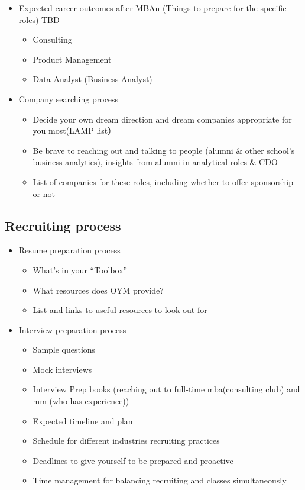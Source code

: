 \documentclass[
]{book}
\providecommand{\tightlist}{%
  \setlength{\itemsep}{0pt}\setlength{\parskip}{0pt}}
\begin{document}
\begin{itemize}
\tightlist
\item
  Expected career outcomes after MBAn (Things to prepare for the specific roles) TBD

  \begin{itemize}
  \tightlist
  \item
    Consulting
  \item
    Product Management
  \item
    Data Analyst (Business Analyst)
  \end{itemize}
\item
  Company searching process

  \begin{itemize}
  \tightlist
  \item
    Decide your own dream direction and dream companies appropriate for you most(LAMP list）
  \item
    Be brave to reaching out and talking to people (alumni \& other school's business analytics), insights from alumni in analytical roles \& CDO
  \item
    List of companies for these roles, including whether to offer sponsorship or not
  \end{itemize}
\end{itemize}

\hypertarget{recruiting-process-1}{%
\subsection{Recruiting process}\label{recruiting-process-1}}

\begin{itemize}
\tightlist
\item
  Resume preparation process

  \begin{itemize}
  \tightlist
  \item
    What's in your ``Toolbox''
  \item
    What resources does OYM provide?
  \item
    List and links to useful resources to look out for
  \end{itemize}
\item
  Interview preparation process

  \begin{itemize}
  \tightlist
  \item
    Sample questions
  \item
    Mock interviews
  \item
    Interview Prep books (reaching out to full-time mba(consulting club) and mm (who has experience))
  \item
    Expected timeline and plan
  \item
    Schedule for different industries recruiting practices
  \item
    Deadlines to give yourself to be prepared and proactive
  \item
    Time management for balancing recruiting and classes simultaneously
  \end{itemize}
\end{itemize}
\end{document}
